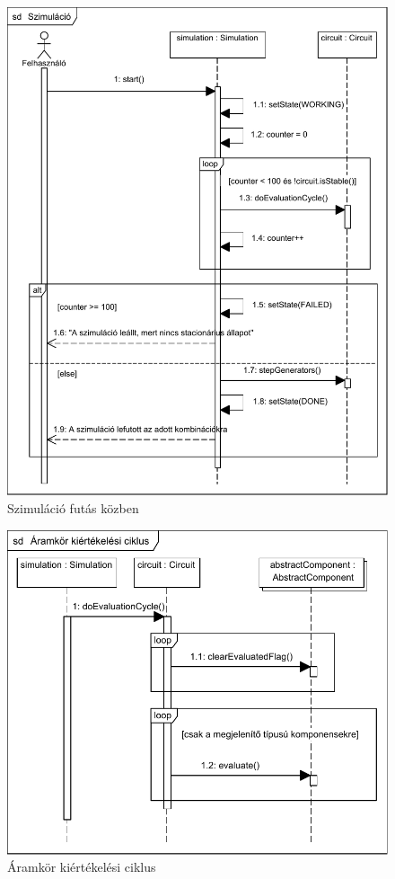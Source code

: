 \begin{figure}[H]
\begin{center}
\includegraphics{chapters/chapter04/seqdiagrams/felhasznalo_szimulacio.pdf}
\caption{Szimuláció futás közben}
\label{fig:user_sim}
\end{center}
\end{figure}

\begin{figure}[H]
\begin{center}
\includegraphics{chapters/chapter04/seqdiagrams/aramkor_szimulacio.pdf}
\caption{Áramkör kiértékelési ciklus}
\label{fig:circuit_sim}
\end{center}
\end{figure}

